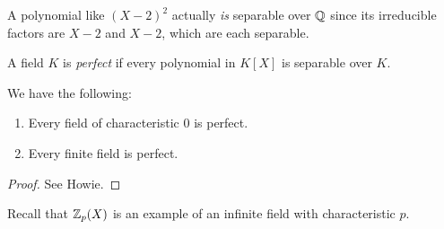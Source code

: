 \begin{remark}
  A polynomial like $(X - 2)^2$ actually \emph{is}
  separable
  over $\mathbb{Q}$ since its irreducible factors are
  $X - 2$ and $X - 2$, which are each separable.
\end{remark}

\begin{definition}
  A field $K$ is \emph{perfect} if every polynomial
  in $K[X]$ is separable over $K$.
\end{definition}

\begin{theorem}
  We have the following:
  \begin{enumerate}
    \item Every field of characteristic $0$ is perfect.
    \item Every finite field is perfect.
  \end{enumerate}
\end{theorem}

\begin{proof}
  See Howie.
\end{proof}

\begin{remark}
  Recall that $\mathbb{Z}_p(X)$ is an example of an infinite
  field with characteristic $p$.
\end{remark}
